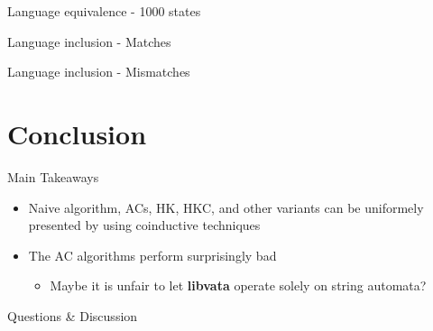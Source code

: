 \documentclass[compress]{beamer}
\begin{document}
\begin{frame}{Language equivalence - 1000 states}
  \begin{figure}
    
  \end{figure}
\end{frame}

\begin{frame}{Language inclusion - Matches}
  \begin{figure}
    
  \end{figure}
\end{frame}

\begin{frame}{Language inclusion - Mismatches}
  \begin{figure}
    
  \end{figure}
\end{frame}

\section{Conclusion}

\begin{frame}{Main Takeaways}
  \begin{itemize}
    \item<1-> Naive algorithm, ACs, HK, HKC, and other variants can be uniformely
      presented by using coinductive techniques
    \item<2-> The AC algorithms perform surprisingly bad
      \begin{itemize}
        \item Maybe it is unfair to let \textbf{libvata} operate solely on string automata?
      \end{itemize}
  \end{itemize}
\end{frame}

\begin{frame}
  \begin{center}
    \huge{Questions \& Discussion}
  \end{center}
\end{frame}
\end{document}
